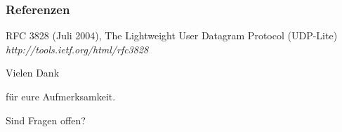\documentclass{beamer}
\begin{document}
\begin{frame}
\frametitle{Referenzen}
\footnotesize{
\begin{thebibliography}{99} %
 RFC 3828 (Juli 2004), 
\newblock The Lightweight User Datagram Protocol (UDP-Lite)
\newblock \emph{http://tools.ietf.org/html/rfc3828}
\end{thebibliography}
}
\end{frame}


\begin{frame}
\Huge{\centerline{Vielen Dank}}
\Huge{\centerline{für eure Aufmerksamkeit.}}
\Huge{\centerline{}}
\Huge{\centerline{Sind Fragen offen?}}
\end{frame}

\end{document}
